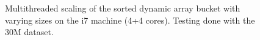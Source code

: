 \begin{landscape}
\begin{figure}[!h]
{        }
        \label{fig:ts_i7_30m_sorted}
        \caption{Multithreaded scaling of the sorted dynamic array bucket with varying sizes on the
        i7 machine (4+4 cores). Testing done with the 30M dataset.}
    \end{figure}
    \begin{figure}[!h]
\end{figure}
\end{landscape}
